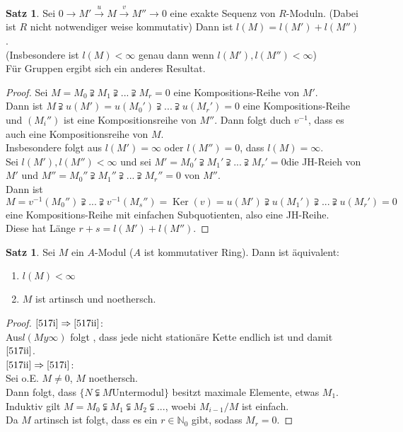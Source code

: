 \documentclass[10pt,a4paper]{article}
\newcommand{\N}{\ensuremath{\mathbb{N}}}
\newcommand{\Ker}{\ensuremath{\operatorname{Ker}}}
\newcounter{thm}[section]
\theoremstyle{definition}
\newtheorem{satz}[thm]{Satz}
\theoremstyle{plain}
\theoremstyle{remark}
\begin{document}
\begin{satz} %
	Sei $0\rightarrow M'\xrightarrow{u} M\xrightarrow{v} M''\rightarrow 0$ eine exakte Sequenz von $R$-Moduln. (Dabei ist $R$ nicht notwendiger weise kommutativ) Dann ist $l(M)=l(M')+l(M'')$.\\
	(Insbesondere ist $l(M)<\infty$ genau dann wenn $l(M'),l(M'')<\infty$)\\
	Für Gruppen ergibt sich ein anderes Resultat.
\end{satz}
\begin{proof}
	 Sei $M=M_0\supsetneqq M_1\supsetneqq...\supsetneqq M_r=0$ eine Kompositions-Reihe von $M'$.\\
	 Dann ist $M\supsetneqq u(M')=u(M_0')\supsetneqq...\supsetneqq u(M_r')=0$ eine Kompositions-Reihe und $(M_i'')$ ist eine Kompositionsreihe von $M''$. Dann folgt duch $v^{-1}$, dass es auch eine Kompositionsreihe von $M$.\\
	 Insbesondere folgt aus $l(M')=\infty $ oder $l(M'')=0$, dass $l(M)=\infty$.\\
	 Sei $l(M'),l(M'')<\infty$ und sei
	 $M'=M_0'\supsetneqq M_1'\supsetneqq...\supsetneqq M_r'=0$die JH-Reieh von $M'$ und $M''=M_0''\supsetneqq M_1''\supsetneqq...\supsetneqq M_r''=0$ von $M''$.\\
	 Dann ist
	 \[M=v^{-1}(M_0'')\supsetneqq ...\supsetneqq v^{-1}(M_s'')=\Ker(v)=u(M')\supsetneqq u(M_1')\supsetneqq...\supsetneqq u(M_r')=0\]
	 eine Kompositions-Reihe mit einfachen Subquotienten, also eine JH-Reihe.\\
	 Diese hat Länge $r+s=l(M')+l(M'')$.
\end{proof}
\begin{satz}
	Sei $M$ ein $A$-Modul ($A$ ist kommutativer Ring). Dann ist äquivalent:\begin{enumerate}
		\item $l(M)<\infty$ \label{517i}
		\item $M$ ist artinsch und noethersch.\label{517ii}
	\end{enumerate}
\end{satz}
\begin{proof}
	$\ref{517i}\Rightarrow\ref{517ii}$: \\
	Aus$l(My\infty)$ folgt , dass jede nicht stationäre Kette endlich ist und damit $\ref{517ii}$.\\
	$\ref{517ii}\Rightarrow\ref{517i}$: \\
	Sei o.E. $M\neq 0$, $M$ noethersch.\\
	Dann folgt, dass $\{N\subsetneqq M\text{Untermodul}\}$ besitzt maximale Elemente, etwas $M_1$.\\
	Induktiv gilt $M=M_0\subsetneqq M_1\subsetneqq M_2\subsetneqq ...$, woebi $M_{i-1}/M$ ist einfach.\\
	Da $M$ artinsch ist folgt, dass es ein $r\in\N_0$ gibt, sodass $M_r=0$.
\end{proof}
\end{document}
